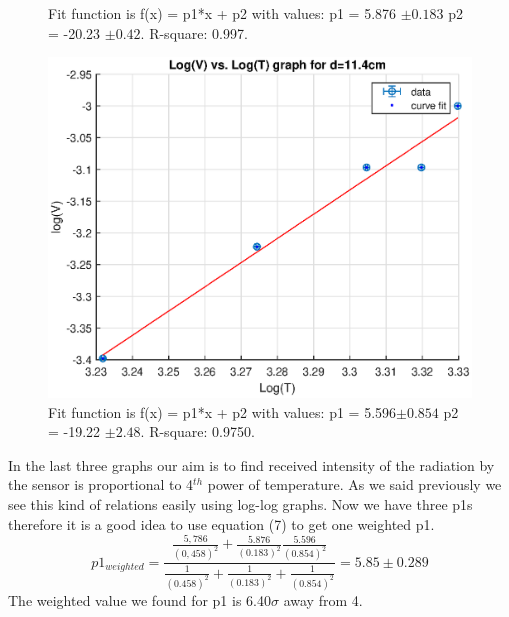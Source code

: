 \documentclass[11pt,a4paper]{article}
\begin{document}
{\begin{figure}[H]
\begin{center}
	\end{center}
	\caption{Fit function is f(x) = p1*x + p2 with values: p1 =       5.876 $\pm0.183$
		p2 =      -20.23 $\pm 0.42$. R-square: 0.997.}
\end{figure}
\begin{figure}[H]
	\begin{center}
		\includegraphics[scale=0.7]{d11.eps}
	\end{center}
	\caption{Fit function is f(x) = p1*x + p2 with values: p1 =       5.596$ \pm0.854$ 
			p2 =      -19.22 $\pm2.48$. R-square: 0.9750.}
\end{figure}
In the last three graphs our aim is to find received intensity of the radiation by the sensor is proportional to 4$^{th}$ power of temperature. As we said previously we see this kind of relations easily using log-log graphs. Now we have three p1s therefore it is a good idea to use equation (7) to get one weighted p1.
\begin{equation}
p1_{weighted}=\frac{\frac{5,786}{{\left(0,458\right)}^{2}}+\frac{5.876}{(0.183)^2}\frac{5.596}{(0.854)^2}}{\frac{1}{{\left(0.458\right)}^{2}}+\frac{1}{(0.183)^2}+\frac{1}{(0.854)^2}}=5.85\pm0.289
\end{equation}
The weighted value we found for p1 is 6.40$\sigma$ away from 4.
\begin{figure}[H]
	\begin{center}

\end{center}
\end{figure}}
\end{document}
